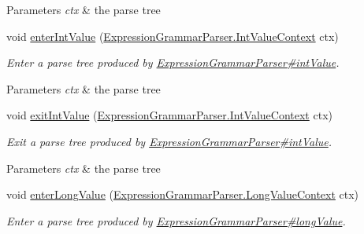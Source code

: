 \begin{DoxyCompactItemize}
\begin{DoxyCompactList}
\begin{DoxyParams}{Parameters}
{\em ctx} & the parse tree\\
\hline
\end{DoxyParams}
 \end{DoxyCompactList}\item 
void \hyperlink{classgov_1_1nasa_1_1jpf_1_1inspector_1_1server_1_1expression_1_1parser_1_1_expression_grammar_base_listener_a7a7dbfba7a295545a777c87681be32f3}{enter\+Int\+Value} (\hyperlink{classgov_1_1nasa_1_1jpf_1_1inspector_1_1server_1_1expression_1_1parser_1_1_expression_grammar_parser_1_1_int_value_context}{Expression\+Grammar\+Parser.\+Int\+Value\+Context} ctx)
\begin{DoxyCompactList}\small\item\em Enter a parse tree produced by \hyperlink{classgov_1_1nasa_1_1jpf_1_1inspector_1_1server_1_1expression_1_1parser_1_1_expression_grammar_parser_a8c7e4b657a12e07efe3ea6429cb9cdcf}{Expression\+Grammar\+Parser\#int\+Value}.


\begin{DoxyParams}{Parameters}
{\em ctx} & the parse tree\\
\hline
\end{DoxyParams}
 \end{DoxyCompactList}\item 
void \hyperlink{classgov_1_1nasa_1_1jpf_1_1inspector_1_1server_1_1expression_1_1parser_1_1_expression_grammar_base_listener_a37f088a3e19ff3d4077f12b62b8c9d4e}{exit\+Int\+Value} (\hyperlink{classgov_1_1nasa_1_1jpf_1_1inspector_1_1server_1_1expression_1_1parser_1_1_expression_grammar_parser_1_1_int_value_context}{Expression\+Grammar\+Parser.\+Int\+Value\+Context} ctx)
\begin{DoxyCompactList}\small\item\em Exit a parse tree produced by \hyperlink{classgov_1_1nasa_1_1jpf_1_1inspector_1_1server_1_1expression_1_1parser_1_1_expression_grammar_parser_a8c7e4b657a12e07efe3ea6429cb9cdcf}{Expression\+Grammar\+Parser\#int\+Value}.


\begin{DoxyParams}{Parameters}
{\em ctx} & the parse tree\\
\hline
\end{DoxyParams}
 \end{DoxyCompactList}\item 
void \hyperlink{classgov_1_1nasa_1_1jpf_1_1inspector_1_1server_1_1expression_1_1parser_1_1_expression_grammar_base_listener_a124b1e30a04c0a9b3c9fda3c9b568317}{enter\+Long\+Value} (\hyperlink{classgov_1_1nasa_1_1jpf_1_1inspector_1_1server_1_1expression_1_1parser_1_1_expression_grammar_parser_1_1_long_value_context}{Expression\+Grammar\+Parser.\+Long\+Value\+Context} ctx)
\begin{DoxyCompactList}\small\item\em Enter a parse tree produced by \hyperlink{classgov_1_1nasa_1_1jpf_1_1inspector_1_1server_1_1expression_1_1parser_1_1_expression_grammar_parser_a304943f298174b8ace1f54cbff8ed321}{Expression\+Grammar\+Parser\#long\+Value}.



\end{DoxyCompactList}
\end{DoxyCompactItemize}
